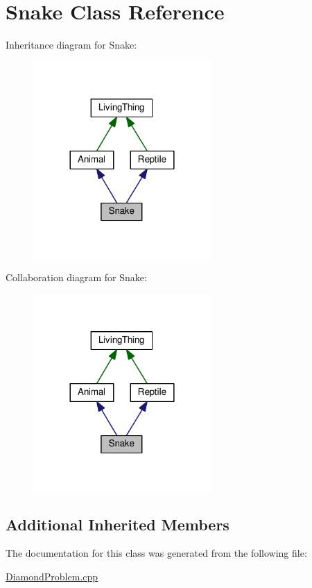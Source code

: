 \hypertarget{classSnake}{}\section{Snake Class Reference}
\label{classSnake}


Inheritance diagram for Snake\+:
\nopagebreak
\begin{figure}[H]
\begin{center}
\leavevmode
\includegraphics[width=192pt]{classSnake__inherit__graph}
\end{center}
\end{figure}


Collaboration diagram for Snake\+:
\nopagebreak
\begin{figure}[H]
\begin{center}
\leavevmode
\includegraphics[width=192pt]{classSnake__coll__graph}
\end{center}
\end{figure}
\subsection*{Additional Inherited Members}


The documentation for this class was generated from the following file\+:\begin{DoxyCompactItemize}
\item 
\hyperlink{DiamondProblem_8cpp}{Diamond\+Problem.\+cpp}\end{DoxyCompactItemize}
